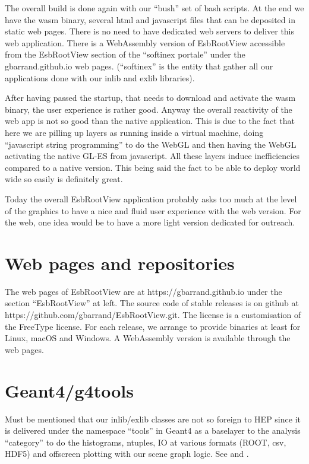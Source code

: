 \documentclass{webofc}
\begin{document}
The overall build is done again with our ``bush''  set of bash scripts. At the end we have the wasm
binary, several html and javascript files that can be deposited in
static web pages. There is no need to have dedicated web servers to
deliver this web application. There is a WebAssembly version of
EsbRootView accessible from the EsbRootView section of the ``softinex
portale'' under the gbarrand.github.io web pages. (``softinex''
\cite{chep13-tools} is the
entity that gather all our applications done with our inlib and exlib libraries).

After having passed the startup, that needs to
download and activate the wasm binary, the user experience is rather
good. Anyway the overall reactivity of the web app is not so good than the native
application. This is due to the fact that here we are pilling up
layers as running
inside a virtual machine, doing ``javascript string programming'' to do the
WebGL and then having the WebGL activating the native GL-ES from javascript.
All these layers induce
inefficiencies compared to a native version. This being said the fact
to be able to deploy world wide so easily is definitely great.

Today the overall EsbRootView application probably asks too much at
the level of the graphics to have a nice and fluid user experience with
the web version. For the web, one idea would be to have a more light version dedicated
for outreach.

\section{Web pages and repositories}
\label{web_pages}
The web pages of EsbRootView are at https://gbarrand.github.io under
the section ``EsbRootView'' at left.
The source code of stable releases is on github at
https://github.com/gbarrand/EsbRootView.git. The license is a
customisation of the FreeType license. For each release, we
arrange to provide binaries at least for Linux, macOS and Windows.
A WebAssembly version is available through the web pages.

\section{Geant4/g4tools}
Must be mentioned that our inlib/exlib classes are not so foreign to
HEP since it is delivered under the namespace ``tools'' in Geant4 \cite{geant4} as a
baselayer to the analysis ``category'' to do the histograms,
ntuples, IO at various formats (ROOT, csv, HDF5) and offscreen plotting
with our scene graph logic. See \cite{chep13-analysis} and \cite{chep16-analysis} .
\end{document}
